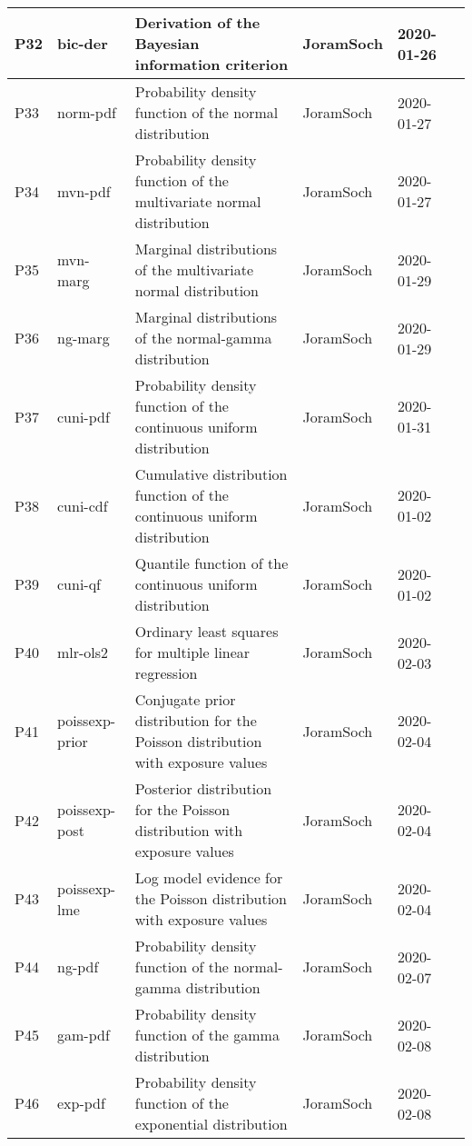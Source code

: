 \documentclass[a4paper,12pt,twoside]{book}
\begin{document}
\begin{longtable}{|p{1cm}|p{2cm}|p{6.5cm}|p{3cm}|p{2cm}|c|}
P32 & bic-der & Derivation of the Bayesian information criterion & JoramSoch & 2020-01-26 & \pageref{sec:bic-der} \\ \hline
P33 & norm-pdf & Probability density function of the normal distribution & JoramSoch & 2020-01-27 & \pageref{sec:norm-pdf} \\ \hline
P34 & mvn-pdf & Probability density function of the multivariate normal distribution & JoramSoch & 2020-01-27 & \pageref{sec:mvn-pdf} \\ \hline
P35 & mvn-marg & Marginal distributions of the multivariate normal distribution & JoramSoch & 2020-01-29 & \pageref{sec:mvn-marg} \\ \hline
P36 & ng-marg & Marginal distributions of the normal-gamma distribution & JoramSoch & 2020-01-29 & \pageref{sec:ng-marg} \\ \hline
P37 & cuni-pdf & Probability density function of the continuous uniform distribution & JoramSoch & 2020-01-31 & \pageref{sec:cuni-pdf} \\ \hline
P38 & cuni-cdf & Cumulative distribution function of the continuous uniform distribution & JoramSoch & 2020-01-02 & \pageref{sec:cuni-cdf} \\ \hline
P39 & cuni-qf & Quantile function of the continuous uniform distribution & JoramSoch & 2020-01-02 & \pageref{sec:cuni-qf} \\ \hline
P40 & mlr-ols2 & Ordinary least squares for multiple linear regression & JoramSoch & 2020-02-03 & \pageref{sec:mlr-ols2} \\ \hline
P41 & poissexp-prior & Conjugate prior distribution for the Poisson distribution with exposure values & JoramSoch & 2020-02-04 & \pageref{sec:poissexp-prior} \\ \hline
P42 & poissexp-post & Posterior distribution for the Poisson distribution with exposure values & JoramSoch & 2020-02-04 & \pageref{sec:poissexp-post} \\ \hline
P43 & poissexp-lme & Log model evidence for the Poisson distribution with exposure values & JoramSoch & 2020-02-04 & \pageref{sec:poissexp-lme} \\ \hline
P44 & ng-pdf & Probability density function of the normal-gamma distribution & JoramSoch & 2020-02-07 & \pageref{sec:ng-pdf} \\ \hline
P45 & gam-pdf & Probability density function of the gamma distribution & JoramSoch & 2020-02-08 & \pageref{sec:gam-pdf} \\ \hline
P46 & exp-pdf & Probability density function of the exponential distribution & JoramSoch & 2020-02-08 & \pageref{sec:exp-pdf} \\ \hline

\end{longtable}
\end{document}
